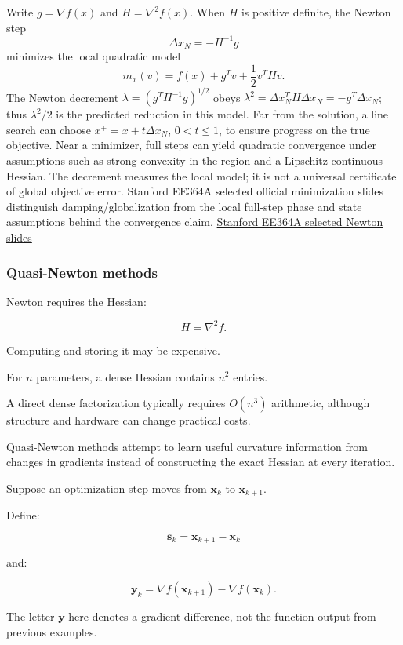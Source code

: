 Write \(g=\nabla f(x)\) and \(H=\nabla^2 f(x)\). When \(H\) is positive definite, the Newton step \[
\Delta x_N=-H^{-1}g
\] minimizes the local quadratic model \[
m_x(v)=f(x)+g^Tv+\frac12v^THv.
\] The Newton decrement \(\lambda=(g^TH^{-1}g)^{1/2}\) obeys \(\lambda^2=\Delta x_N^TH\Delta x_N=-g^T\Delta x_N\); thus \(\lambda^2/2\) is the predicted reduction in this model. Far from the solution, a line search can choose \(x^+=x+t\Delta x_N\), \(0<t\le1\), to ensure progress on the true objective. Near a minimizer, full steps can yield quadratic convergence under assumptions such as strong convexity in the region and a Lipschitz-continuous Hessian. The decrement measures the local model; it is not a universal certificate of global objective error. Stanford EE364A selected official minimization slides distinguish damping/globalization from the local full-step phase and state assumptions behind the convergence claim. \href{https://web.stanford.edu/class/ee364a/lectures/lectures_hd.pdf}{Stanford EE364A selected Newton slides}

\subsubsection{Quasi-Newton methods}\label{02-foundations-ii-ch026-quasi-newton-methods}

Newton requires the Hessian:

\[
H=\nabla^2 f.
\]

Computing and storing it may be expensive.

For \(n\) parameters, a dense Hessian contains \(n^2\) entries.

A direct dense factorization typically requires \(O(n^3)\) arithmetic, although structure and hardware can change practical costs.

Quasi-Newton methods attempt to learn useful curvature information from changes in gradients instead of constructing the exact Hessian at every iteration.

Suppose an optimization step moves from \(\mathbf x_k\) to \(\mathbf x_{k+1}\).

Define:

\[
\boxed{ \mathbf s_k=\mathbf x_{k+1}-\mathbf x_k }
\]

and:

\[
\boxed{ \mathbf y_k= \nabla f(\mathbf x_{k+1})- \nabla f(\mathbf x_k) }.
\]

The letter \(\mathbf y\) here denotes a gradient difference, not the function output from previous examples.

